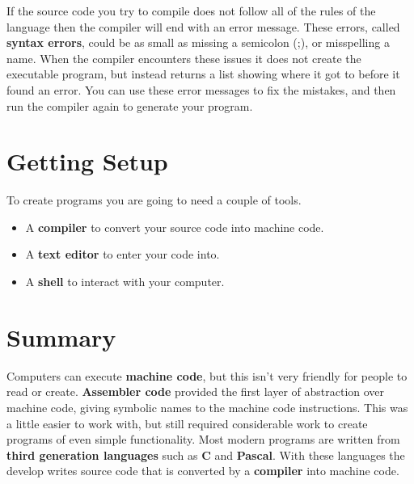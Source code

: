 
If the source code you try to compile does not follow all of the rules of the language then the compiler will end with an error message. These errors, called \textbf{syntax errors}, could be as small as missing a semicolon (;), or misspelling a name. When the compiler encounters these issues it does not create the executable program, but instead returns a list showing where it got to before it found an error. You can use these error messages to fix the mistakes, and then run the compiler again to generate your program.




\section{Getting Setup} %
\label{sec:getting_setup}

To create programs you are going to need a couple of tools.

\begin{itemize}
  \item A \textbf{compiler} to convert your source code into machine code.
  \item A \textbf{text editor} to enter your code into.
  \item A \textbf{shell} to interact with your computer.
\end{itemize}




\section{Summary} %
\label{sec:summary-compilers}

Computers can execute \textbf{machine code}, but this isn't very friendly for people to read or create. \textbf{Assembler code} provided the first layer of abstraction over machine code, giving symbolic names to the machine code instructions. This was a little easier to work with, but still required considerable work to create programs of even simple functionality. Most modern programs are written from \textbf{third generation languages} such as \textbf{C} and \textbf{Pascal}. With these languages the develop writes source code that is converted by a \textbf{compiler} into machine code.


